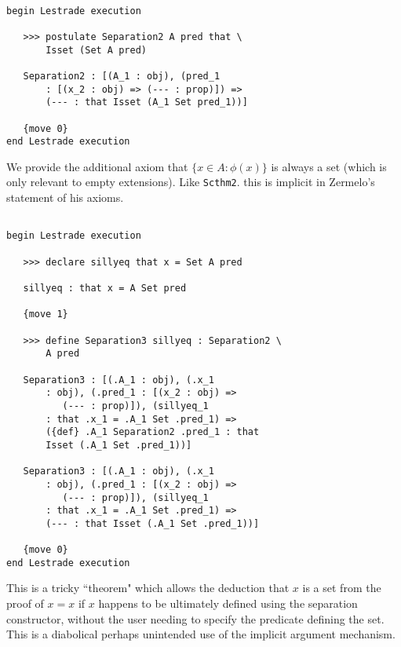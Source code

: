 \documentclass[12pt]{article}
\begin{document}
\begin{verbatim}

begin Lestrade execution

   >>> postulate Separation2 A pred that \
       Isset (Set A pred)

   Separation2 : [(A_1 : obj), (pred_1 
       : [(x_2 : obj) => (--- : prop)]) => 
       (--- : that Isset (A_1 Set pred_1))]

   {move 0}
end Lestrade execution
\end{verbatim}

We provide the additional axiom that $\{x \in A:\phi(x)\}$ is always a set (which is only relevant to empty extensions).  Like {\tt Scthm2}. this is implicit in Zermelo's statement of his axioms.

\begin{verbatim}

begin Lestrade execution

   >>> declare sillyeq that x = Set A pred

   sillyeq : that x = A Set pred

   {move 1}

   >>> define Separation3 sillyeq : Separation2 \
       A pred

   Separation3 : [(.A_1 : obj), (.x_1 
       : obj), (.pred_1 : [(x_2 : obj) => 
          (--- : prop)]), (sillyeq_1 
       : that .x_1 = .A_1 Set .pred_1) => 
       ({def} .A_1 Separation2 .pred_1 : that 
       Isset (.A_1 Set .pred_1))]

   Separation3 : [(.A_1 : obj), (.x_1 
       : obj), (.pred_1 : [(x_2 : obj) => 
          (--- : prop)]), (sillyeq_1 
       : that .x_1 = .A_1 Set .pred_1) => 
       (--- : that Isset (.A_1 Set .pred_1))]

   {move 0}
end Lestrade execution
\end{verbatim}

This is a tricky ``theorem" which allows the deduction that $x$ is a set from the proof of $x=x$ if $x$ happens to be ultimately defined using the separation constructor, without the user needing to specify the predicate defining the set.  This is a diabolical perhaps unintended use of the implicit argument mechanism.
\end{document}

